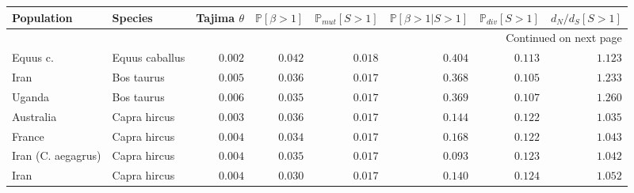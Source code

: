 \documentclass{article}
\newcommand{\dn}{d_N}
\newcommand{\ds}{d_S}
\newcommand{\dnds}{\dn / \ds}
\newcommand{\Sphy}{S}
\newcommand{\Spop}{\beta}
\begin{document}
    \begin{center}
        \footnotesize
        \begin{longtable}{|l|l|r|r|r|r|r|r|}
            \toprule
            Population           & Species             & Tajima $\theta$ & $\mathbb{P} [ \Spop > 1 ]$ & $\mathbb{P}_{mut}[\Sphy > 1]$ & $\mathbb{P} [ \Spop > 1  | \Sphy > 1]$ & $\mathbb{P}_{div}[\Sphy > 1]$ & $\dnds[\Sphy > 1]$ \\
            \midrule
            \endhead
            \midrule
            \multicolumn{8}{r}{{Continued on next page}} \\
            \midrule
            \endfoot

            \bottomrule
            \endlastfoot
            Equus c.             & Equus caballus      & $ 0.002$        & $ 0.042$                   & $ 0.018$                      & $ 0.404$                             & $ 0.113$                      & $ 1.123$           \\
            Iran                 & Bos taurus          & $ 0.005$        & $ 0.036$                   & $ 0.017$                      & $ 0.368$                             & $ 0.105$                      & $ 1.233$           \\
            Uganda               & Bos taurus          & $ 0.006$        & $ 0.035$                   & $ 0.017$                      & $ 0.369$                             & $ 0.107$                      & $ 1.260$           \\
            Australia            & Capra hircus        & $ 0.003$        & $ 0.036$                   & $ 0.017$                      & $ 0.144$                             & $ 0.122$                      & $ 1.035$           \\
            France               & Capra hircus        & $ 0.004$        & $ 0.034$                   & $ 0.017$                      & $ 0.168$                             & $ 0.122$                      & $ 1.043$           \\
            Iran (C. aegagrus)   & Capra hircus        & $ 0.004$        & $ 0.035$                   & $ 0.017$                      & $ 0.093$                             & $ 0.123$                      & $ 1.042$           \\
            Iran                 & Capra hircus        & $ 0.004$        & $ 0.030$                   & $ 0.017$                      & $ 0.140$                             & $ 0.124$                      & $ 1.052$           \\

\end{longtable}
\end{center}
\end{document}
